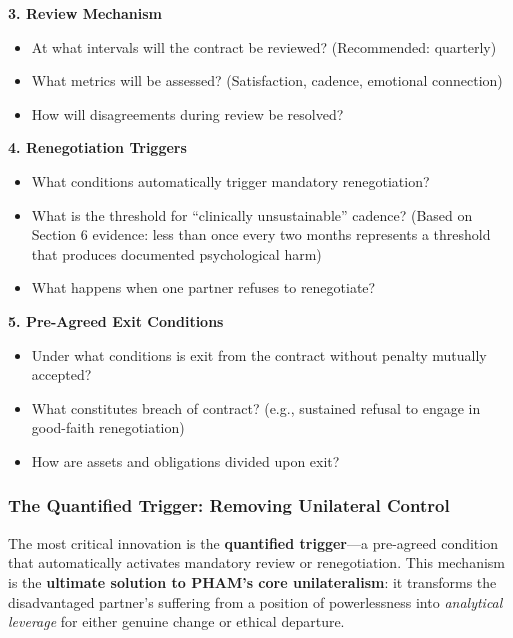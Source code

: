 \documentclass[12pt, letterpaper]{article}
\begin{document}
\textbf{3. Review Mechanism}
\begin{itemize}
    \item At what intervals will the contract be reviewed? (Recommended: quarterly)
    \item What metrics will be assessed? (Satisfaction, cadence, emotional connection)
    \item How will disagreements during review be resolved?
\end{itemize}

\textbf{4. Renegotiation Triggers}
\begin{itemize}
    \item What conditions automatically trigger mandatory renegotiation?
    \item What is the threshold for ``clinically unsustainable'' cadence? (Based on Section 6 evidence: less than once every two months represents a threshold that produces documented psychological harm)
    \item What happens when one partner refuses to renegotiate?
\end{itemize}

\textbf{5. Pre-Agreed Exit Conditions}
\begin{itemize}
    \item Under what conditions is exit from the contract without penalty mutually accepted?
    \item What constitutes breach of contract? (e.g., sustained refusal to engage in good-faith renegotiation)
    \item How are assets and obligations divided upon exit?
\end{itemize}

\subsubsection{The Quantified Trigger: Removing Unilateral Control}

The most critical innovation is the \textbf{quantified trigger}---a pre-agreed condition that automatically activates mandatory review or renegotiation. This mechanism is the \textbf{ultimate solution to PHAM's core unilateralism}: it transforms the disadvantaged partner's suffering from a position of powerlessness into \textit{analytical leverage} for either genuine change or ethical departure.
\end{document}
